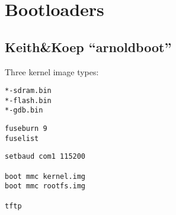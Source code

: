 \chapter{Bootloaders}

\section{Keith\&Koep ``arnoldboot''}

Three kernel image types:

\begin{description}
\item[\texttt{*-sdram.bin}]
\item[\texttt{*-flash.bin}]
\item[\texttt{*-gdb.bin}]
\end{description}

\begin{verbatim}
fuseburn 9
fuselist
\end{verbatim}



\begin{verbatim}
setbaud com1 115200

boot mmc kernel.img
boot mmc rootfs.img

tftp
\end{verbatim}


